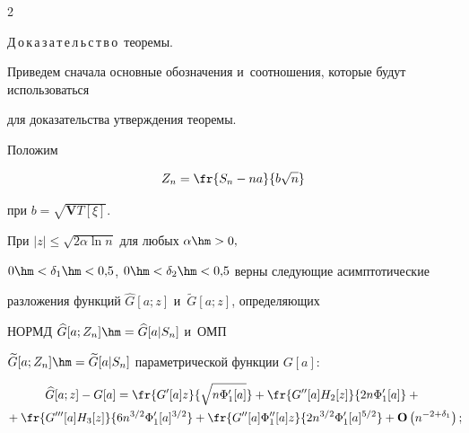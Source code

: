 \begin{multicols}{2}
\smallskip





\noindent


Д\,о\,к\,а\,з\,а\,т\,е\,л\,ь\,с\,т\,в\,о\ теоремы. 


Приведем сначала основные обозначения и~соотношения, которые будут использоваться 


для доказательства утверждения теоремы.





  Положим


 $$


 Z_n=\fr{S_n-na}{b\sqrt{n}}


 $$


 при $b=\sqrt{\mathbf{V}T[\xi]}.$





  При $|z|\le \sqrt {2\alpha \ln n}$ для любых $\alpha\hm>0,$


 $0\hm<\delta_1\hm<0{,}5$, $0\hm<\delta_2\hm<0{,}5$ верны следующие асимптотические 


 разложения функций $\widehat{G}[a;z]$ и~$\widetilde{G}[a;z]$, определяющих 


 НОРМД $\widehat{G}[a;Z_n]\hm=\widehat{G}[a|S_n]$ и~ОМП 


 $\widetilde{G}[a;Z_n]\hm=\widetilde{G}[a|S_n]$ параметрической функции $G[a]$:


 \begin{multline}


 \widehat{G}[a;z]-G[a]=


 \fr{G'[a] z}{\sqrt{n\Phi'_1[a]}}


 + \fr{G''[a] H_2[z]}{2 n\Phi'_1[a]}


 +{}\\


 \!{}+ \fr{G'''[a] H_3[z]}{6 n^{3/2}\Phi'_1[a]^{3/2}}+ \fr{G''[a]\Phi''_1[a] z}{2 n^{3/2}\Phi'_1[a]^{5/2} }


 + \mathbf{O}\left( {n^{-2+\delta_1} } \right);\!\!


 \label{e7-ch}


\end{multline}





\vspace*{-12pt}









\end{multicols}
